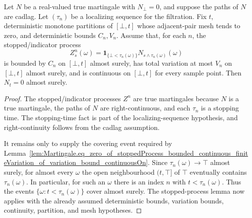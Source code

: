 \begin{lemma}\label{lem:Martingale.eq_zero_of_localizingSequence_bounded_continuous_finiteVariation_of_variation_bound_continuousOn}
Let \(N\) be a real-valued true martingale with \(N_\bot=0\), and suppose
the paths of \(N\) are cadlag.  Let \((\tau_n)\) be a localizing sequence for
the filtration.  Fix \(t\), deterministic monotone partitions of
\([\bot,t]\) whose adjacent-pair mesh tends to zero, and deterministic bounds
\(C_n,V_n\).  Assume that, for each \(n\), the stopped/indicator process
\[
  Z^n_s(\omega)
  =
  \mathbf 1_{\{\bot<\tau_n(\omega)\}}
  N_{s\wedge\tau_n(\omega)}(\omega)
\]
is bounded by \(C_n\) on \([\bot,t]\) almost surely, has total variation at
most \(V_n\) on \([\bot,t]\) almost surely, and is continuous on
\([\bot,t]\) for every sample point.  Then \(N_t=0\) almost surely.
\end{lemma}

\begin{proof}
The stopped/indicator processes \(Z^n\) are true martingales because \(N\) is
a true martingale, the paths of \(N\) are right-continuous, and each
\(\tau_n\) is a stopping time.  The stopping-time fact is part of the
localizing-sequence hypothesis, and right-continuity follows from the cadlag
assumption.

It remains only to supply the covering event required by
Lemma~\ref{lem:Martingale.eq_zero_of_stoppedProcess_bounded_continuous_finiteVariation_of_variation_bound_continuousOn}.
Since \(\tau_n(\omega)\to\top\) almost surely, for almost every \(\omega\) the
open neighbourhood \((t,\top]\) of \(\top\) eventually contains
\(\tau_n(\omega)\).  In particular, for such an \(\omega\) there is an index
\(n\) with \(t<\tau_n(\omega)\).  Thus the events
\(\{\omega:t<\tau_n(\omega)\}\) cover almost surely.  The stopped-process
lemma now applies with the already assumed deterministic bounds, variation
bounds, continuity, partition, and mesh hypotheses.
\end{proof}


